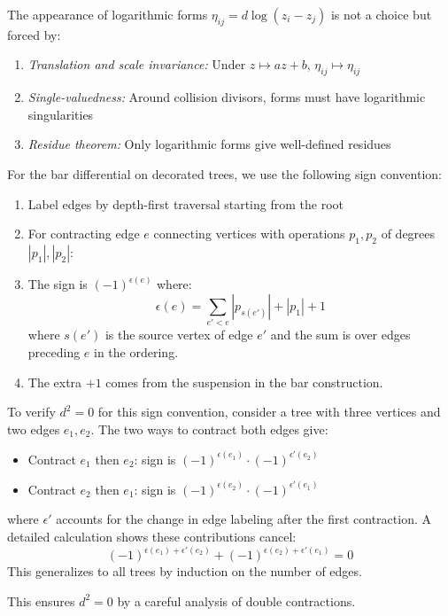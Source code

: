 \begin{proposition}\label{prop:log-forms-conformal-invariance}
The appearance of logarithmic forms $\eta_{ij} = d\log(z_i - z_j)$ is not a choice but forced by:
\begin{enumerate}
\item \emph{Translation and scale invariance:} Under $z \mapsto az + b$, $\eta_{ij} \mapsto \eta_{ij}$
\item \emph{Single-valuedness:} Around collision divisors, forms must have logarithmic singularities
\item \emph{Residue theorem:} Only logarithmic forms give well-defined residues
\end{enumerate}
\end{proposition}

\begin{convention}
For the bar differential on decorated trees, we use the following sign convention:
\begin{enumerate}
\item Label edges by depth-first traversal starting from the root
\item For contracting edge $e$ connecting vertices with operations $p_1, p_2$ of degrees $|p_1|, |p_2|$:
\item The sign is $(-1)^{\epsilon(e)}$ where:
\[\epsilon(e) = \sum_{e' < e} |p_{s(e')}| + |p_1| + 1\]
where $s(e')$ is the source vertex of edge $e'$ and the sum is over edges preceding $e$ in the ordering.
\item The extra $+1$ comes from the suspension in the bar construction.
\end{enumerate}

To verify $d^2 = 0$ for this sign convention, consider a tree with three vertices and two edges $e_1, e_2$. The two ways to contract both edges give:
\begin{itemize}
\item Contract $e_1$ then $e_2$: sign is $(-1)^{\epsilon(e_1)} \cdot (-1)^{\epsilon'(e_2)}$
\item Contract $e_2$ then $e_1$: sign is $(-1)^{\epsilon(e_2)} \cdot (-1)^{\epsilon'(e_1)}$
\end{itemize}
where $\epsilon'$ accounts for the change in edge labeling after the first contraction. A detailed calculation shows these contributions cancel:
\[(-1)^{\epsilon(e_1) + \epsilon'(e_2)} + (-1)^{\epsilon(e_2) + \epsilon'(e_1)} = 0\]
This generalizes to all trees by induction on the number of edges.

This ensures $d^2 = 0$ by a careful analysis of double contractions.
\end{convention}


